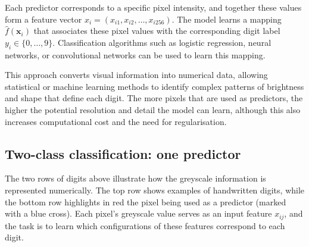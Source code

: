 \documentclass[
  letterpaper,
  DIV=11,
  numbers=noendperiod]{scrartcl}
\begin{document}
Each predictor corresponds to a specific pixel intensity, and together
these values form a feature vector
\(x_i = (x_{i1}, x_{i2}, \ldots, x_{i256})\). The model learns a mapping
\(\hat{f}(\mathbf{x}_i)\) that associates these pixel values with the
corresponding digit label \(y_i \in \{0, \ldots, 9\}\). Classification
algorithms such as logistic regression, neural networks, or
convolutional networks can be used to learn this mapping.

This approach converts visual information into numerical data, allowing
statistical or machine learning methods to identify complex patterns of
brightness and shape that define each digit. The more pixels that are
used as predictors, the higher the potential resolution and detail the
model can learn, although this also increases computational cost and the
need for regularisation.

\subsection{Two-class classiﬁcation: one
predictor}\label{two-class-classiuxfb01cation-one-predictor}

The two rows of digits above illustrate how the greyscale information is
represented numerically. The top row shows examples of handwritten
digits, while the bottom row highlights in red the pixel being used as a
predictor (marked with a blue cross). Each pixel's greyscale value
serves as an input feature \(x_{ij}\), and the task is to learn which
configurations of these features correspond to each digit.
\end{document}
